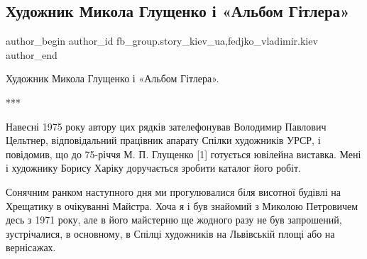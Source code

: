  
 
 
 
 
 
\subsection{Художник Микола Глущенко і «Альбом Гітлера»}
\label{sec:29_11_2021.fb.fb_group.story_kiev_ua.1.albom_gitlera_hudozhnik_gluschenko}
 
\ifcmt
 author_begin
   author_id fb_group.story_kiev_ua,fedjko_vladimir.kiev
 author_end
\fi

Художник Микола Глущенко і «Альбом Гітлера».

***

Навесні 1975 року автору цих рядків зателефонував Володимир Павлович Цельтнер,
відповідальний працівник апарату Спілки художників УРСР, і повідомив, що до
75-річчя М. П. Глущенко [1] готується ювілейна виставка. Мені і художнику
Борису Харіку доручається зробити каталог його робіт.

Сонячним ранком наступного дня ми прогулювалися біля висотної будівлі на
Хрещатику в очікуванні Майстра. Хоча я і був знайомий з Миколою Петровичем десь
з 1971 року, але в його майстерню ще жодного разу не був запрошений,
зустрічалися, в основному, в Спілці художників на Львівській площі або на
вернісажах.

\begin{multicols}{2} %
\setlength{\parindent}{0pt}






\end{multicols} %

